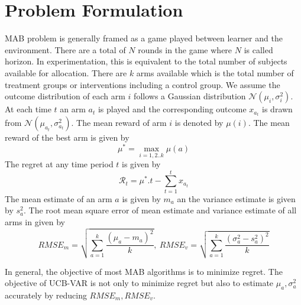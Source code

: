 \documentclass[12pt, letterpaper]{article}
\begin{document}
\section*{Problem Formulation}

MAB problem is generally framed as a game played between learner and the environment. There are a total of $N$ rounds in the game where $N$ is called horizon. In experimentation, this is equivalent to the total  number of subjects available for allocation. There are $k$ arms available which is the total number of treatment groups or interventions including a control group. We assume the outcome distribution of each arm $i$ follows a Gaussian distribution $\mathcal{N}(\mu_i, \sigma_i^2)$. At each time $t$ an arm $a_t$ is played and the corresponding outcome $x_{a_t}$ is drawn from $\mathcal{N}(\mu_{a_t}, \sigma_{a_t}^2)$. The mean reward of arm $i$ is denoted by $\mu(i)$. The mean reward of the best arm is given by 
$$\mu^* = \max_{i=1,2..k}\mu(a)$$ 
The regret at any time period $t$ is given by
$$\mathcal{R}_t = \mu^* . t - \sum_{t=1}^{t} x_{a_t}$$
The mean estimate of an arm $a$ is given by $m_a$ an the variance estimate is given by $s_a^2$. The root mean square error of mean estimate and variance estimate of all arms in given by 
$$RMSE_m = \sqrt{\sum_{a=1}^{k} \frac{(\mu_a - m_a)^2}{k}}, \: RMSE_v = \sqrt{\sum_{a=1}^{k} \frac{(\sigma_a^2 - s_a^2)^2}{k}}$$


In general, the objective of most MAB algorithms is to minimize regret. The objective of UCB-VAR is not only to minimize regret but also to estimate $\mu_{a}, \sigma_{a}^2$ accurately by reducing $RMSE_m, RMSE_v$.
\end{document}
